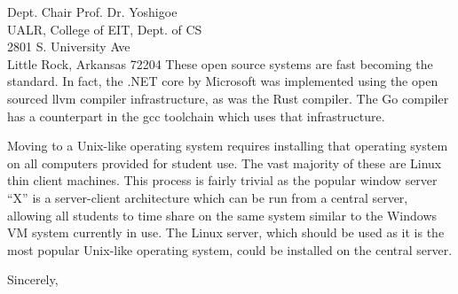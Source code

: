 \documentclass{letter}
\begin{document}
\begin{letter}{
    Dept. Chair Prof. Dr. Yoshigoe \\
    UALR, College of EIT, Dept. of CS \\
    2801 S. University Ave \\
    Little Rock, Arkansas 72204
  }
    These open source systems are fast becoming the standard. In fact, the .NET core by Microsoft was implemented using the open sourced \gls{llvm} compiler infrastructure, as was the Rust compiler. The Go compiler has a counterpart in the \gls{gcc} toolchain which uses that infrastructure.

    Moving to a Unix-like operating system requires installing that operating system on all computers provided for student use. The vast majority of these are Linux thin client machines. This process is fairly trivial as the popular window server ``X'' is a server-client architecture which can be run from a central server, allowing all students to time share on the same system similar to the Windows VM system currently in use. The Linux server, which should be used as it is the most popular Unix-like operating system, could be installed on the central server.

    \closing{Sincerely,}

  \end{letter}

  \printglossaries
  \printbibliography
\end{document}
